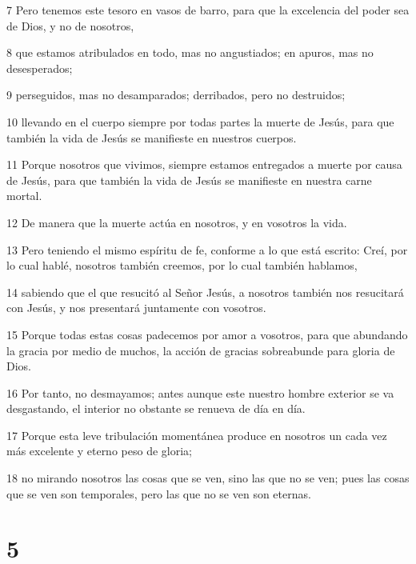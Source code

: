 \par 7 Pero tenemos este tesoro en vasos de barro, para que la excelencia del poder sea de Dios, y no de nosotros,
\par 8 que estamos atribulados en todo, mas no angustiados; en apuros, mas no desesperados;
\par 9 perseguidos, mas no desamparados; derribados, pero no destruidos;
\par 10 llevando en el cuerpo siempre por todas partes la muerte de Jesús, para que también la vida de Jesús se manifieste en nuestros cuerpos.
\par 11 Porque nosotros que vivimos, siempre estamos entregados a muerte por causa de Jesús, para que también la vida de Jesús se manifieste en nuestra carne mortal.
\par 12 De manera que la muerte actúa en nosotros, y en vosotros la vida.
\par 13 Pero teniendo el mismo espíritu de fe, conforme a lo que está escrito: Creí, por lo cual hablé, nosotros también creemos, por lo cual también hablamos,
\par 14 sabiendo que el que resucitó al Señor Jesús, a nosotros también nos resucitará con Jesús, y nos presentará juntamente con vosotros.
\par 15 Porque todas estas cosas padecemos por amor a vosotros, para que abundando la gracia por medio de muchos, la acción de gracias sobreabunde para gloria de Dios.
\par 16 Por tanto, no desmayamos; antes aunque este nuestro hombre exterior se va desgastando, el interior no obstante se renueva de día en día.
\par 17 Porque esta leve tribulación momentánea produce en nosotros un cada vez más excelente y eterno peso de gloria;
\par 18 no mirando nosotros las cosas que se ven, sino las que no se ven; pues las cosas que se ven son temporales, pero las que no se ven son eternas.

\chapter{5}

